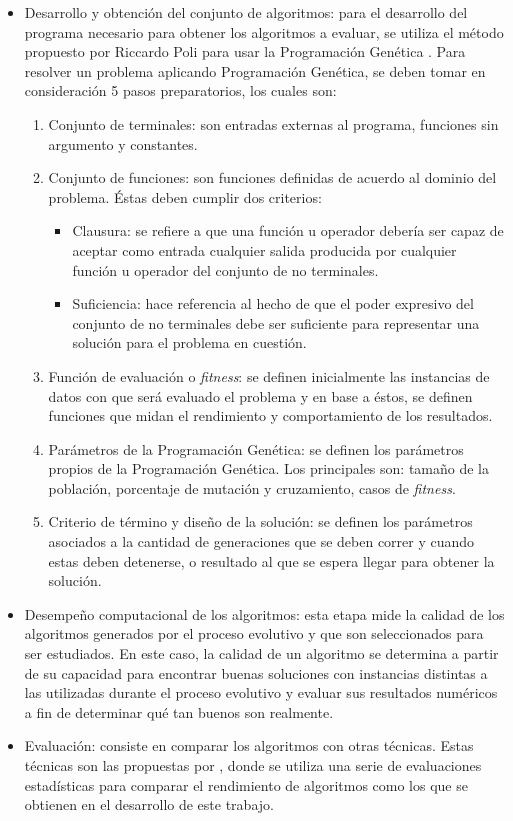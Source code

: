 \begin{itemize}
  \item Desarrollo y obtención del conjunto de algoritmos: para el desarrollo del programa necesario para obtener los algoritmos a evaluar, se utiliza el método propuesto por Riccardo Poli para usar la Programación Genética \cite{poli_2008}.
Para resolver un problema aplicando Programación Genética, se deben tomar en consideración 5 pasos preparatorios, los cuales son:
  \begin{enumerate}
    \item Conjunto de terminales: son entradas externas al programa, funciones sin argumento y constantes.
    \item Conjunto de funciones: son funciones definidas de acuerdo al dominio del problema. Éstas deben cumplir dos criterios:
    \begin{itemize}
      \item Clausura: se refiere a que una función u operador debería ser capaz de aceptar como entrada cualquier salida producida por cualquier función u operador del conjunto de no terminales.
      \item Suficiencia: hace referencia al hecho de que el poder expresivo del conjunto de no terminales debe ser suficiente para representar una solución para el problema en cuestión. 
    \end{itemize}
    \item Función de evaluación o \textit{fitness}: se definen inicialmente las instancias de datos con que será evaluado el problema y en base a éstos, se definen funciones que midan el rendimiento y comportamiento de los resultados.
    \item Parámetros de la Programación Genética: se definen los parámetros propios de la Programación Genética. Los principales son: tamaño de la población, porcentaje de mutación y cruzamiento, casos de \textit{fitness}.
    \item Criterio de término y diseño de la solución: se definen los parámetros asociados a la cantidad de generaciones que se deben correr y cuando estas deben detenerse, o  resultado al que se espera llegar para obtener la solución.
  \end{enumerate}
  \item Desempeño computacional de los algoritmos: esta etapa mide la calidad de los algoritmos generados por el proceso evolutivo y que son seleccionados para ser estudiados. En este caso, la calidad de un algoritmo se determina a partir de su capacidad para encontrar buenas soluciones con instancias distintas a las utilizadas durante el proceso evolutivo y evaluar sus resultados numéricos a fin de determinar qué tan buenos son realmente.
  
  \item Evaluación: consiste en comparar los algoritmos con otras técnicas. Estas técnicas son las propuestas por \cite{derrac_2011}, donde se utiliza una serie de evaluaciones estadísticas para comparar el rendimiento de algoritmos como los que se obtienen en el desarrollo de este trabajo.
\end{itemize}

